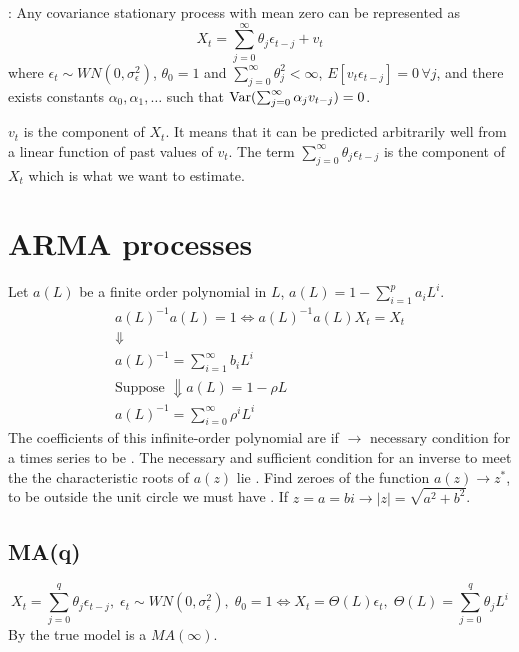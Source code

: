 \begin{theorem}
    : Any covariance stationary process with mean zero can be represented as
    \begin{equation*}
        X_t = \sum_{j=0}^{\infty}\theta_j \epsilon_{t-j} + v_t
    \end{equation*}
    where $\epsilon_t\sim WN(0, \sigma^2_{\epsilon})$, $\theta_0 = 1$ and $\sum_{j=0}^{\infty}\theta_j^2<\infty$, $E[v_t\epsilon_{t-j}] = 0\,\forall j$,
    and there exists constants $\alpha_0, \alpha_1,\ldots$ such that $\operatorname{Var}(\sum_{j=0}^{\infty}\alpha_j v_{t-j}) = 0$.
\end{theorem}
$v_t$ is the  component of $X_t$. It means that it can be predicted arbitrarily well from a linear function of past values of $v_t$.
The term $\sum_{j=0}^{\infty}\theta_j \epsilon_{t-j}$ is the  component of $X_t$ which is what we want to estimate.


\section{ARMA processes}

Let $a(L)$ be a finite order polynomial in $L$, $a(L) = 1 - \sum_{i=1}^{p}a_i L^i$.
\begin{gather*}
    a(L)^{-1}a(L) = 1 \Leftrightarrow a(L)^{-1}a(L)X_t = X_t\\
    \Downarrow\\
    a(L)^{-1} = \sum_{i=1}^{\infty}b_i L^i\\
    \text{Suppose }\Downarrow a(L) = 1-\rho L\\
    a(L)^{-1} = \sum_{i=0}^{\infty}\rho^i L^i
\end{gather*}
The coefficients of this infinite-order polynomial are  if $\to$ necessary condition for a times series to be .
The necessary and sufficient condition for an inverse to meet the  the characteristic roots of $a(z)$ lie .
Find zeroes of the function $a(z)\to z^*$, to be outside the unit circle we must have .
If $z = a = bi\to |z| = \sqrt{a^2+b^2}$. 

\subsection{MA(q)}

\begin{equation*}
    X_t = \sum_{j=0}^{q}\theta_j\epsilon_{t-j},\; \epsilon_t\sim WN(0, \sigma^2_{\epsilon}),\; \theta_0 = 1 
    \Leftrightarrow X_t = \Theta(L)\epsilon_t,\; \Theta(L) = \sum_{j=0}^{q}\theta_j L^i
\end{equation*}
By  the true model is a $MA(\infty)$. 

